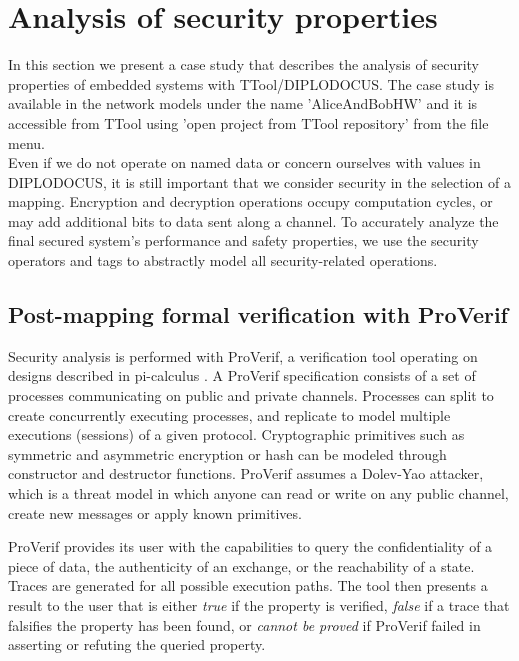 \documentclass{llncs}
\begin{document}
\pagebreak
\newpage
\section{Analysis of security properties}
\label{sec:Security}
%

In this section we present a case study that describes the analysis of security properties of embedded systems with
TTool/DIPLODOCUS. The  case study is available in the network models under the name 'AliceAndBobHW' and it is accessible from TTool using 'open project from TTool repository' from the file menu.\\
%

Even if we do not operate on named data or concern ourselves with values in DIPLODOCUS, it is still important that we
consider security in the selection of a mapping. Encryption and decryption
operations occupy computation cycles, or may add additional bits to data sent along a channel. To accurately analyze the final secured system's performance and safety
properties, we use the security operators and tags to abstractly model all security-related operations.


\subsection{Post-mapping formal verification with ProVerif}

Security analysis is performed with ProVerif, a verification tool operating on designs described in pi-calculus
\cite{BlanchetJCS08}. A ProVerif specification consists of a set of processes communicating on public and private
channels. Processes can split to create concurrently executing processes, and replicate to model multiple executions
(sessions) of a given protocol. Cryptographic primitives such as symmetric and asymmetric encryption or hash can be
modeled through constructor and destructor functions. ProVerif assumes a Dolev-Yao attacker, which is a threat model in
which anyone can read or write on any public channel, create new messages or apply known primitives.

ProVerif provides its user with the capabilities to query the confidentiality of a piece of data, the authenticity of an
exchange, or the reachability of a state. Traces are generated for all possible execution paths. The tool then presents
a result to the user that is either \textit{true} if the property is verified, \textit{false} if a trace that falsifies
the property has been found, or \textit{cannot be proved} if ProVerif failed in asserting or refuting the queried
property.
\end{document}
